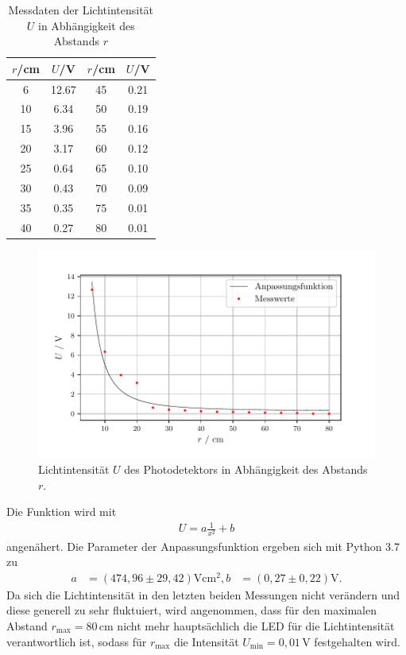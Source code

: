 \begin{table}[H]
\centering
\caption{Messdaten der Lichtintensität $U$ in Abhängigkeit des Abstands $r$}
\label{tab:data4}
\begin{tabular}{c c c c}
\toprule
$r$\:/\:\si{\centi\meter}& $U$\:/\:\si{\volt} & $r$\:/\:\si{\centi\meter}& $U$\:/\:\si{\volt} \\
\midrule
6  & 12.67 & 45 & 0.21 \\
10 &  6.34 & 50 & 0.19 \\
15 &  3.96 & 55 & 0.16 \\
20 &  3.17 & 60 & 0.12 \\
25 &  0.64 & 65 & 0.10 \\
30 &  0.43 & 70 & 0.09 \\
35 &  0.35 & 75 & 0.01 \\
40 &  0.27 & 80 & 0.01 \\
\bottomrule
\end{tabular}
\end{table}

\begin{figure}[H]
  \centering
  \includegraphics{plot3.pdf}
  \caption{Lichtintensität $U$ des Photodetektors in Abhängigkeit des Abstands $r$.}
\end{figure}

Die Funktion wird mit
\begin{align*}
U = a \frac{1}{x^{2}} + b
\end{align*}
angenähert.
Die Parameter der Anpassungsfunktion ergeben sich mit Python 3.7 zu
\begin{align*}
a &= (474,96 \pm 29,42)\si{\volt\centi\meter\squared},
b &= (0,27 \pm 0,22)\si{\volt}.
\end{align*}
Da sich die Lichtintensität in den letzten beiden Messungen nicht verändern und
diese generell zu sehr fluktuiert, wird
angenommen, dass für den maximalen Abstand $r_\text{max} = 80\,\si{\centi\meter}$
nicht mehr hauptsächlich die LED für die Lichtintensität verantwortlich ist, sodass
für $r_\text{max}$ die Intensität $U_\text{min} = 0,01\,\si{\volt}$ festgehalten wird.